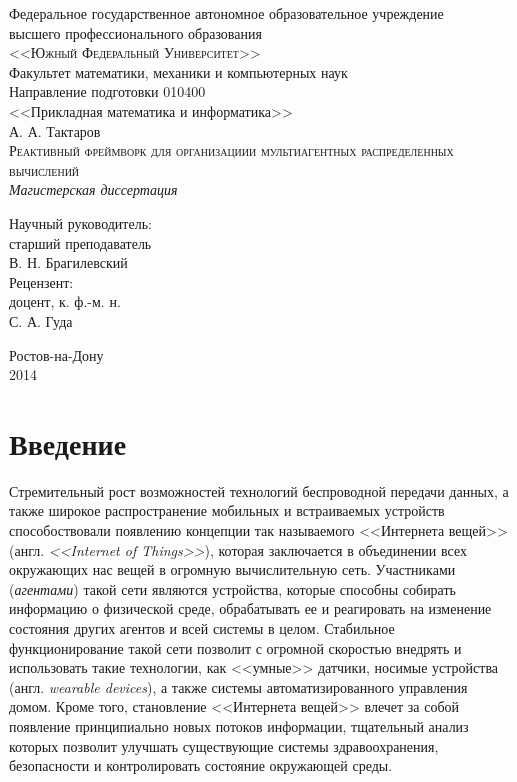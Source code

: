 \documentclass[a4paper,14pt,href]{article}
\begin{document}
\thispagestyle{empty}
\begin{center}
Федеральное государственное автономное образовательное учреждение \\
высшего профессионального образования \\
\textsc{<<Южный Федеральный Университет>>}\\[1.0cm]

Факультет математики, механики и компьютерных наук\\[1.0cm]

Направление подготовки 010400 \\
<<Прикладная математика и информатика>>\\[3cm]

А. А. Тактаров \\[1.0cm]
\textsc{Реактивный фреймворк для организациии мультиагентных распределенных вычислений}\\[1.0cm]

\textit{Магистерская диссертация}\\[2.0cm]

\begin{flushright}
    Научный руководитель: \\
    старший преподаватель \\
    В. Н. Брагилевский \\[1.0cm]

    Рецензент: \\
    доцент, к. ф.-м. н.\\
    С. А. Гуда
\end{flushright}

\vfill

  Ростов-на-Дону\\
  2014
\end{center}

\newpage
\tableofcontents

\newpage
\section*{Введение}

Стремительный рост возможностей технологий беспроводной передачи данных, а также широкое распространение мобильных и встраиваемых устройств
способоствовали появлению концепции так называемого <<Интернета вещей>> (англ. \textit{<<Internet of Things>>})\cite{IoTWired}, которая заключается в объединении всех окружающих нас вещей в огромную вычислительную сеть. Участниками (\textit{агентами}) такой сети являются устройства, которые способны собирать информацию о физической среде, обрабатывать ее и реагировать на изменение состояния других агентов и всей системы в целом. Стабильное функционирование такой сети позволит с огромной скоростью внедрять и использовать такие технологии, как <<умные>> датчики\cite{NestThermostat}, носимые устройства (англ. \textit{wearable devices}), а также системы автоматизированного управления домом. Кроме того, становление <<Интернета вещей>> влечет за собой появление принципиально новых потоков информации, тщательный анализ которых позволит улучшать существующие системы здравоохранения, безопасности и контролировать состояние окружающей среды.
\end{document}
